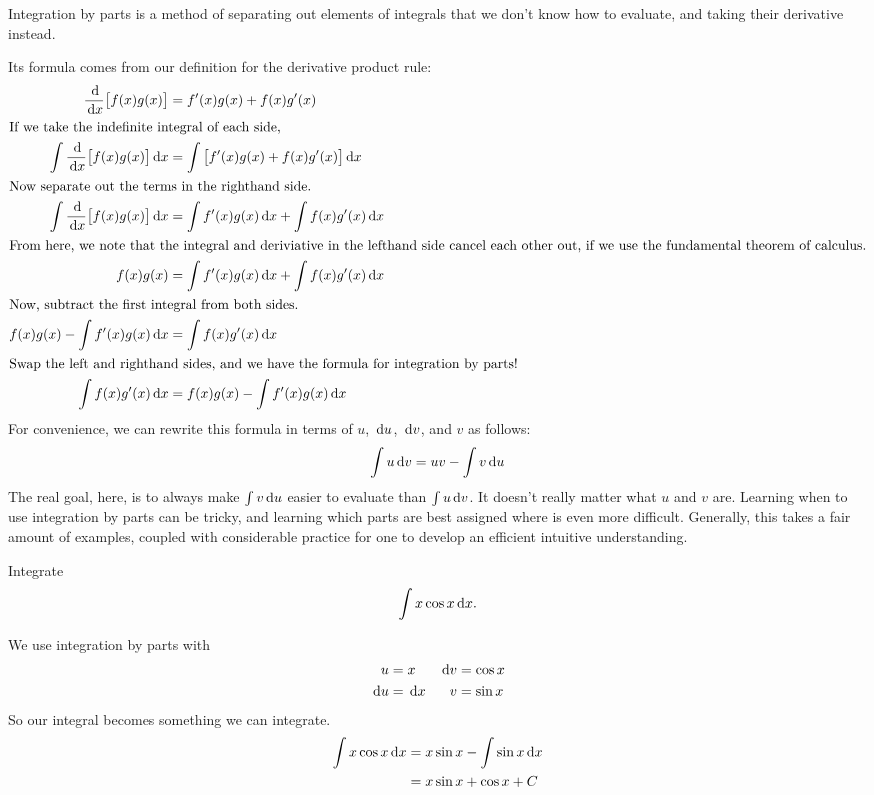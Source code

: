 Integration by parts is a method of separating out elements of integrals that we don't know how to evaluate, and taking their derivative instead.

Its formula comes from our definition for the derivative product rule:
  \begin{align*}
    \frac{\,\mathrm{d}}{\,\mathrm{d} x}\big[ f(x) g(x) \big] &= f'(x)g(x)+f(x)g'(x) \\
    \intertext{If we take the indefinite integral of each side,}
    \int \frac{\,\mathrm{d}}{\,\mathrm{d} x}\big[ f(x) g(x) \big] \,\mathrm{d} x &= \int \big[f'(x)g(x)+f(x)g'(x)\big] \,\mathrm{d} x\\
    \intertext{Now separate out the terms in the righthand side.}
    \int \frac{\,\mathrm{d}}{\,\mathrm{d} x}\big[ f(x) g(x) \big] \,\mathrm{d} x &= \int f'(x)g(x)\,\mathrm{d} x +\int f(x)g'(x) \,\mathrm{d} x \\
    \intertext{From here, we note that the integral and deriviative in the lefthand side cancel each other out, if we use the fundamental theorem of calculus.}
    f(x)g(x) &= \int f'(x)g(x)\,\mathrm{d} x +\int f(x)g'(x) \,\mathrm{d} x \\
    \intertext{Now, subtract the first integral from both sides.}
    f(x)g(x) -\int f'(x)g(x) \,\mathrm{d} x &= \int f(x)g'(x) \,\mathrm{d} x \\
    \intertext{Swap the left and righthand sides, and we have the formula for integration by parts!}
     \int f(x)g'(x) \,\mathrm{d} x&=f(x)g(x) -\int f'(x)g(x) \,\mathrm{d} x \\
  \end{align*}
  For convenience, we can rewrite this formula in terms of $u$, $\,\mathrm{d} u$, $\,\mathrm{d} v$, and $v$ as follows:
\begin{equation}
  \int u \,\mathrm{d} v =  uv - \int v \,\mathrm{d} u
  \label{equation:intbyparts}
\end{equation}
The real goal, here, is to always make $\int v \,\mathrm{d} u$ easier to evaluate than $\int u \,\mathrm{d} v$.
It doesn't really matter what $u$ and $v$ are.
Learning when to use integration by parts can be tricky, and learning which parts are best assigned where is even more difficult.
Generally, this takes a fair amount of examples, coupled with considerable practice for one to develop an efficient intuitive understanding.
\begin{ex}
  Integrate
  \[
    \int x \cos x \,\mathrm{d} x.
    \]
    \begin{sol}
      We use integration by parts with
      \begin{align*}
        u&= x & \,\mathrm{d} v &= \cos x \\
        \,\mathrm{d} u &= \,\mathrm{d} x & v &= \sin x
      \end{align*}
      So our integral becomes something we can integrate.
      \begin{align*}
        \int x \cos x \,\mathrm{d} x &= x \sin x - \int \sin x \,\mathrm{d} x \\
        &= x \sin x + \cos x +C
      \end{align*}
    \end{sol}
\end{ex}
